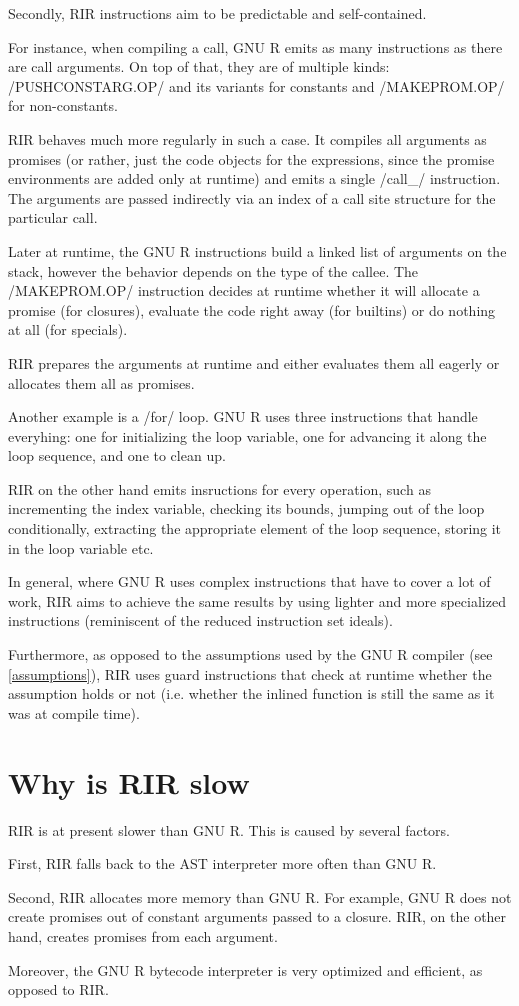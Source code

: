 Secondly, RIR instructions aim to be predictable and self-contained.

For instance, when compiling a call, GNU R emits as many instructions as there are call arguments. On top of that, they are of multiple kinds: \rinline/PUSHCONSTARG.OP/ and its variants for constants and \rinline/MAKEPROM.OP/ for non-constants.

RIR behaves much more regularly in such a case. It compiles all arguments as promises (or rather, just the code objects for the expressions, since the promise environments are added only at runtime) and emits a single \cinline/call_/ instruction. The arguments are passed indirectly via an index of a call site structure for the particular call.

Later at runtime, the GNU R instructions build a linked list of arguments on the stack, however the behavior depends on the type of the callee. The \rinline/MAKEPROM.OP/ instruction decides at runtime whether it will allocate a promise (for closures), evaluate the code right away (for builtins) or do nothing at all (for specials).

RIR prepares the arguments at runtime and either evaluates them all eagerly or allocates them all as promises.

Another example is a \rinline/for/ loop. GNU R uses three instructions that handle everyhing: one for initializing the loop variable, one for advancing it along the loop sequence, and one to clean up.

RIR on the other hand emits insructions for every operation, such as incrementing the index variable, checking its bounds, jumping out of the loop conditionally, extracting the appropriate element of the loop sequence, storing it in the loop variable etc.

In general, where GNU R uses complex instructions that have to cover a lot of work, RIR aims to achieve the same results by using lighter and more specialized instructions (reminiscent of the reduced instruction set ideals).

Furthermore, as opposed to the assumptions used by the GNU R compiler (see \ref{assumptions}), RIR uses guard instructions that check at runtime whether the assumption holds or not (i.e. whether the inlined function is still the same as it was at compile time).


\section{Why is RIR slow}

RIR is at present slower than GNU R. This is caused by several factors.

First, RIR falls back to the AST interpreter more often than GNU R.

Second, RIR allocates more memory than GNU R. For example, GNU R does not create promises out of constant arguments passed to a closure. RIR, on the other hand, creates promises from each argument.

Moreover, the GNU R bytecode interpreter is very optimized and efficient, as opposed to RIR.
